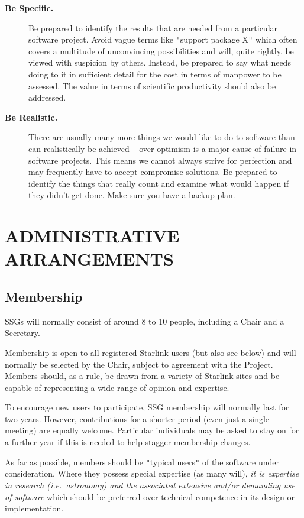 \documentclass[11pt]{article}
\newcommand{\htmladdnormallink}[2]{#1}
\newcommand{\xlabel}[1]{}
\newcommand{\sitesref}[1]{\htmladdnormallink{#1}{http://star-www.rl.ac.uk/sites.html}}
\newcommand{\st}[1]{{\em{#1}}}
\newcommand{\qt}[1]{``#1''}
\renewcommand{\qt}[1]{{\tt{"}}#1{\tt{"}}}
\begin{document}
\begin{description}
\item[{\bf Be Specific.}] Be prepared to identify the results that are
needed from a particular software project. Avoid vague terms like
\qt{support package X} which often covers a multitude of unconvincing
possibilities and will, quite rightly, be viewed with suspicion by
others. Instead, be prepared to say what needs doing to it in
sufficient detail for the cost in terms of manpower to be assessed.
The value in terms of scientific productivity should also be
addressed.

\item[{\bf Be Realistic.}] There are usually many more things we would
like to do to software than can realistically be achieved --
over-optimism is a major cause of failure in software projects. This
means we cannot always strive for perfection and may frequently have
to accept compromise solutions.  Be prepared to identify the things
that really count and examine what would happen if they didn't get
done. Make sure you have a backup plan.

\end{description}

\section{\xlabel{admin_arrangements}\label{sect:admin}ADMINISTRATIVE ARRANGEMENTS}

\subsection{Membership}

SSGs will normally consist of around 8 to 10 people, including a Chair
and a Secretary.

Membership is open to all registered Starlink users (but also see
below) and will normally be selected by the Chair, subject to
agreement with the Project. Members should, as a rule, be drawn from a
variety of \sitesref{Starlink sites} and be capable of representing a
wide range of opinion and expertise.

To encourage new users to participate, SSG membership will normally
last for two years. However, contributions for a shorter period (even
just a single meeting) are equally welcome. Particular individuals may
be asked to stay on for a further year if this is needed to help stagger
membership changes.

As far as possible, members should be \qt{typical users} of the
software under consideration. Where they possess special expertise (as
many will), \st{it is expertise in research (\st{i.e.}\ astronomy) and
the associated extensive and/or demanding use of software} which
should be preferred over technical competence in its design or
implementation.
\end{document}
